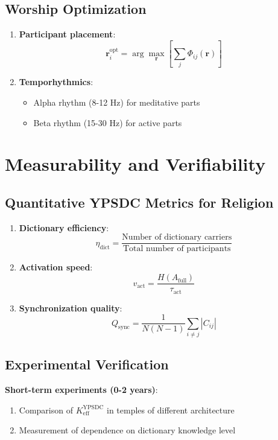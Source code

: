 \documentclass[12pt,a4paper]{article}
\begin{document}
	\subsection{Worship Optimization}
	
	\begin{enumerate}
		\item \textbf{Participant placement}:
		\[
		\mathbf{r}_i^{\mathrm{opt}} = \arg\max_{\mathbf{r}} \left[\sum_j \Phi_{ij}(\mathbf{r})\right]
		\]
		\item \textbf{Temporhythmics}:
		\begin{itemize}
			\item Alpha rhythm (8-12 Hz) for meditative parts
			\item Beta rhythm (15-30 Hz) for active parts
		\end{itemize}
	\end{enumerate}
	
	\section{Measurability and Verifiability}
	
	\subsection{Quantitative YPSDC Metrics for Religion}
	
	\begin{enumerate}
		\item \textbf{Dictionary efficiency}:
		\[
		\eta_{\mathrm{dict}} = \frac{\text{Number of dictionary carriers}}{\text{Total number of participants}}
		\]
		\item \textbf{Activation speed}:
		\[
		v_{\mathrm{act}} = \frac{H(A_{\mathrm{full}})}{\tau_{\mathrm{act}}}
		\]
		\item \textbf{Synchronization quality}:
		\[
		Q_{\mathrm{sync}} = \frac{1}{N(N-1)} \sum_{i \neq j} |C_{ij}|
		\]
	\end{enumerate}
	
	\subsection{Experimental Verification}
	
	\textbf{Short-term experiments (0-2 years)}:
	\begin{enumerate}
		\item Comparison of $K_{\mathrm{eff}}^{\mathrm{YPSDC}}$ in temples of different architecture
		\item Measurement of dependence on dictionary knowledge level
	\end{enumerate}
	
\end{document}
